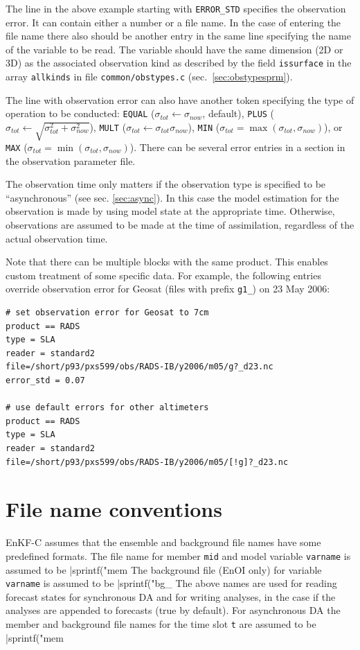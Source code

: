 \documentclass[11pt]{report}
\begin{document}
The line in the above example starting with \verb|ERROR_STD| specifies the observation error.
It can contain either a number or a file name.
In the case of entering the file name there also should be another entry in the same line specifying the name of the variable to be read.
The variable should have the same dimension (2D or 3D) as the associated observation kind as described by the field \verb|issurface| in the array \verb|allkinds| in file \verb|common/obstypes.c| (sec.~\ref{sec:obstypesprm}).

The line with observation error can also have another token specifying the type of operation to be conducted: \verb|EQUAL| ($\sigma_{tot} \leftarrow \sigma_{now}$, default), \verb|PLUS| ($\sigma_{tot} \leftarrow \sqrt{\sigma_{tot}^2 + \sigma_{now}^2}$), \verb|MULT| ($\sigma_{tot} \leftarrow \sigma_{tot} \sigma_{now}$), \verb|MIN| ($\sigma_{tot} = \max(\sigma_{tot}, \sigma_{now})$), or \verb|MAX| ($\sigma_{tot} = \min(\sigma_{tot}, \sigma_{now})$).
There can be several error entries in a section in the observation parameter file.

The observation time only matters if the observation type is specified to be ``asynchronous'' (see sec. \ref{sec:async}).
In this case the model estimation for the observation is made by using model state at the appropriate time.
Otherwise, observations are assumed to be made at the time of assimilation, regardless of the actual observation time.

Note that there can be multiple blocks with the same product.
This enables custom treatment of some specific data.
For example, the following entries override observation error for Geosat (files with prefix \verb|g1_|) on 23 May 2006:
\begin{Verbatim}[frame=single,fontsize=\footnotesize]
# set observation error for Geosat to 7cm
product == RADS
type = SLA
reader = standard2
file=/short/p93/pxs599/obs/RADS-IB/y2006/m05/g?_d23.nc
error_std = 0.07

# use default errors for other altimeters
product == RADS
type = SLA
reader = standard2
file=/short/p93/pxs599/obs/RADS-IB/y2006/m05/[!g]?_d23.nc
\end{Verbatim}

\section{File name conventions}

EnKF-C assumes that the ensemble and background file names have some predefined formats.
The file name for member \verb|mid| and model variable \verb|varname| is assumed to be \spverb|sprintf("mem%
The background file (EnOI only) for variable \verb|varname| is assumed to be \spverb|sprintf("bg_%
The above names are used for reading forecast states for synchronous DA and for writing analyses, in the case if the analyses are appended to forecasts (true by default).
For asynchronous DA the member and background file names for the time slot \verb|t| are assumed to be \spverb|sprintf("mem%
\end{document}
